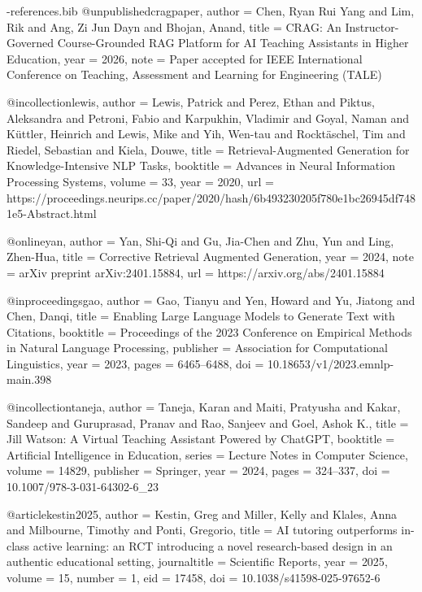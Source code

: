 \begin{filecontents*}[overwrite]{\jobname-references.bib}
@unpublished{cragpaper,
 author = {Chen, Ryan Rui Yang and Lim, Rik and Ang, Zi Jun Dayn and Bhojan, Anand},
 title = {{CRAG: An Instructor-Governed Course-Grounded RAG Platform for AI Teaching Assistants in Higher Education}},
 year = {2026},
 note = {Paper accepted for IEEE International Conference on Teaching, Assessment and Learning for Engineering (TALE)}
}

@incollection{lewis,
 author = {Lewis, Patrick and Perez, Ethan and Piktus, Aleksandra and Petroni, Fabio and Karpukhin, Vladimir and Goyal, Naman and K{\"u}ttler, Heinrich and Lewis, Mike and Yih, Wen-tau and Rockt{\"a}schel, Tim and Riedel, Sebastian and Kiela, Douwe},
 title = {{Retrieval-Augmented Generation for Knowledge-Intensive NLP Tasks}},
 booktitle = {Advances in Neural Information Processing Systems},
 volume = {33},
 year = {2020},
 url = {https://proceedings.neurips.cc/paper/2020/hash/6b493230205f780e1bc26945df7481e5-Abstract.html}
}

@online{yan,
 author = {Yan, Shi-Qi and Gu, Jia-Chen and Zhu, Yun and Ling, Zhen-Hua},
 title = {{Corrective Retrieval Augmented Generation}},
 year = {2024},
 note = {arXiv preprint arXiv:2401.15884},
 url = {https://arxiv.org/abs/2401.15884}
}

@inproceedings{gao,
 author = {Gao, Tianyu and Yen, Howard and Yu, Jiatong and Chen, Danqi},
 title = {{Enabling Large Language Models to Generate Text with Citations}},
 booktitle = {Proceedings of the 2023 Conference on Empirical Methods in Natural Language Processing},
 publisher = {Association for Computational Linguistics},
 year = {2023},
 pages = {6465--6488},
 doi = {10.18653/v1/2023.emnlp-main.398}
}

@incollection{taneja,
 author = {Taneja, Karan and Maiti, Pratyusha and Kakar, Sandeep and Guruprasad, Pranav and Rao, Sanjeev and Goel, Ashok K.},
 title = {{Jill Watson: A Virtual Teaching Assistant Powered by ChatGPT}},
 booktitle = {Artificial Intelligence in Education},
 series = {Lecture Notes in Computer Science},
 volume = {14829},
 publisher = {Springer},
 year = {2024},
 pages = {324--337},
 doi = {10.1007/978-3-031-64302-6_23}
}

@article{kestin2025,
 author = {Kestin, Greg and Miller, Kelly and Klales, Anna and Milbourne, Timothy and Ponti, Gregorio},
 title = {{AI tutoring outperforms in-class active learning: an RCT introducing a novel research-based design in an authentic educational setting}},
 journaltitle = {Scientific Reports},
 year = {2025},
 volume = {15},
 number = {1},
 eid = {17458},
 doi = {10.1038/s41598-025-97652-6}
}


\end{filecontents*}
